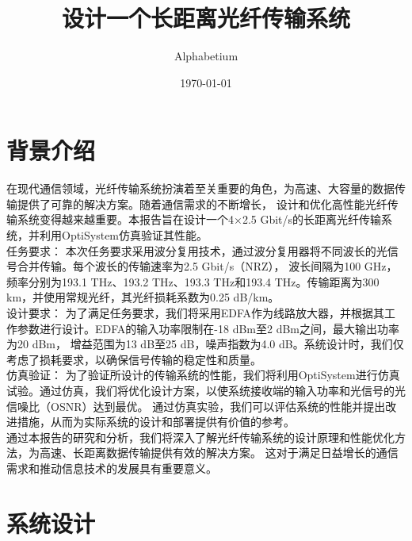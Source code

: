 \documentclass[12pt, a4paper, oneside]{article}
\title{设计一个长距离光纤传输系统}
\date{\today}
\author{Alphabetium}
\begin{document}
\begin{spacing}{2.0}
\tableofcontents
\maketitle


\section{背景介绍}
在现代通信领域，光纤传输系统扮演着至关重要的角色，为高速、大容量的数据传输提供了可靠的解决方案。随着通信需求的不断增长，
设计和优化高性能光纤传输系统变得越来越重要。本报告旨在设计一个4×2.5 Gbit/s的长距离光纤传输系统，并利用OptiSystem仿真验证其性能。
\\
任务要求：
本次任务要求采用波分复用技术，通过波分复用器将不同波长的光信号合并传输。每个波长的传输速率为2.5 Gbit/s（NRZ），
波长间隔为100 GHz，频率分别为193.1 THz、193.2 THz、193.3 THz和193.4 THz。传输距离为300 km，并使用常规光纤，其光纤损耗系数为0.25 dB/km。
\\
设计要求：
为了满足任务要求，我们将采用EDFA作为线路放大器，并根据其工作参数进行设计。EDFA的输入功率限制在-18 dBm至2 dBm之间，最大输出功率为20 dBm，
增益范围为13 dB至25 dB，噪声指数为4.0 dB。系统设计时，我们仅考虑了损耗要求，以确保信号传输的稳定性和质量。
\\
仿真验证：
为了验证所设计的传输系统的性能，我们将利用OptiSystem进行仿真试验。通过仿真，我们将优化设计方案，以使系统接收端的输入功率和光信号的光信噪比（OSNR）达到最优。
通过仿真实验，我们可以评估系统的性能并提出改进措施，从而为实际系统的设计和部署提供有价值的参考。
\\
通过本报告的研究和分析，我们将深入了解光纤传输系统的设计原理和性能优化方法，为高速、长距离数据传输提供有效的解决方案。
这对于满足日益增长的通信需求和推动信息技术的发展具有重要意义。

\section{系统设计}

\end{spacing}
\end{document}
